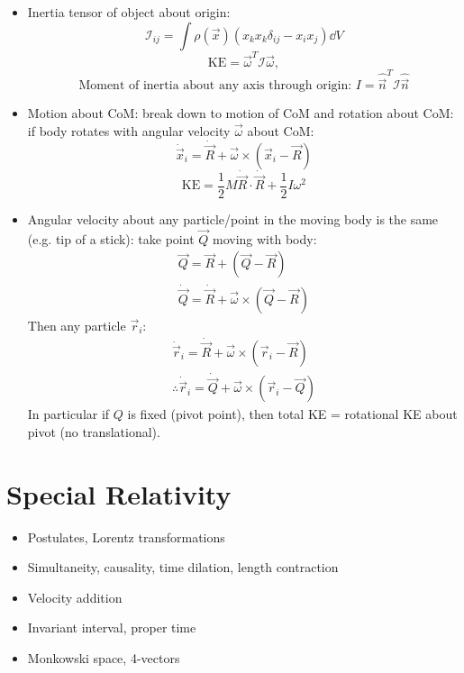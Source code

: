 \begin{itemize}
      \item Inertia tensor of object about origin: \[\mathcal{I}_{ij} = \int \rho(\vec{x}) (x_k x_k \delta_{ij} - x_i x_j) \dd{V} \]
            \[\text{KE} = \vec{\omega}^T \mathcal{I}\vec{\omega}, \]
            \[\text{Moment of inertia about any axis through origin: } I = \hat{\vec{n}}^T \mathcal{I}\hat{\vec{n}} \]

      \item Motion about CoM: break down to motion of CoM and rotation about CoM:
            if body rotates with angular velocity $\vec{\omega}$ about CoM:
            \[\dot{\vec{x}}_i = \dot{\vec{R}} + \vec{\omega} \times (\vec{x}_i-\vec{R}) \]
            \[\text{KE} = \frac{1}{2} M \dot{\vec{R}} \cdot \dot{\vec{R}} + \frac{1}{2}I \omega^2\]

      \item Angular velocity about any particle/point in the moving body is the same (e.g. tip of a stick): take point $\vec{Q}$ moving with body:
            \begin{align*}
                  \vec{Q} = \vec{R} + (\vec{Q}-\vec{R}) \\
                  \dot{\vec{Q}} = \dot{\vec{R}} + \vec{\omega} \times (\vec{Q}-\vec{R})
            \end{align*}
            Then any particle $\vec{r}_i$:
            \begin{align*}
                  \dot{\vec{r}}_i = \dot{\vec{R}} + \vec{\omega} \times (\vec{r}_i-\vec{R}) \\
                  \therefore \dot{\vec{r}}_i = \dot{\vec{Q}} + \vec{\omega} \times (\vec{r}_i-\vec{Q})
            \end{align*}
            In particular if $Q$ is fixed (pivot point), then total KE = rotational KE about pivot (no translational).
\end{itemize}



\section{Special Relativity}
\begin{itemize}
      \item Postulates, Lorentz transformations
      \item Simultaneity, causality, time dilation, length contraction
      \item Velocity addition
      \item Invariant interval, proper time
      \item Monkowski space, 4-vectors
\end{itemize}



